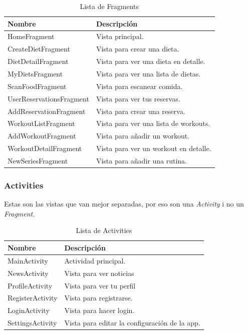 \documentclass[12pt,a4paper]{article}
\begin{document}
\begin{table}[h!]
\centering
\begin{tabular}{  |l|l| }
\hline
Nombre & Descripción \\
 \hline
 HomeFragment & Vista principal. \\ 
 \hline
 CreateDietFragment & Vista para crear una dieta. \\ 
 \hline
  DietDetailFragment & Vista para ver una dieta en detalle.  \\ 
 \hline
  MyDietsFragment & Vista para ver una lista de dietas. \\ 
 \hline
  ScanFoodFragment & Vista para escanear comida. \\ 
 \hline
  UserReservationsFragment & Vista para ver tus reservas. \\ 
 \hline
  AddReservationFragment & Vista para crear una reserva. \\ 
 \hline
  WorkoutListFragment & Vista para ver una lista de workouts. \\ 
 \hline
 AddWorkoutFragment & Vista para añadir un workout. \\ 
 \hline
 WorkoutDetailFragment & Vista para ver un workout en detalle.  \\ 
 \hline
 NewSeriesFragment & Vista para añadir una rutina.  \\ 
 \hline
\end{tabular}
\caption{Lista de Fragments}
\end{table}

\clearpage

\subsubsection{Activities}
Estas son las vistas que van mejor separadas, por eso son una \textit{Activity} i no un \textit{Fragment}.

\begin{table}[h!]
\centering
\begin{tabular}{  |l|l| }
\hline
Nombre & Descripción \\
 \hline
 MainActivity & Actividad principal. \\ 
 \hline
 NewsActivity & Vista para ver noticias \\ 
 \hline
 ProfileActivity & Vista para ver tu perfil \\ 
 \hline
 RegisterActivity & Vista para registrarse. \\ 
 \hline
 LoginActivity & Vista para hacer login. \\ 
 \hline
 SettingsActivity & Vista para editar la configuración de la app. \\ 
 \hline

\end{tabular}
\caption{Lista de Activities}
\end{table}
\end{document}
